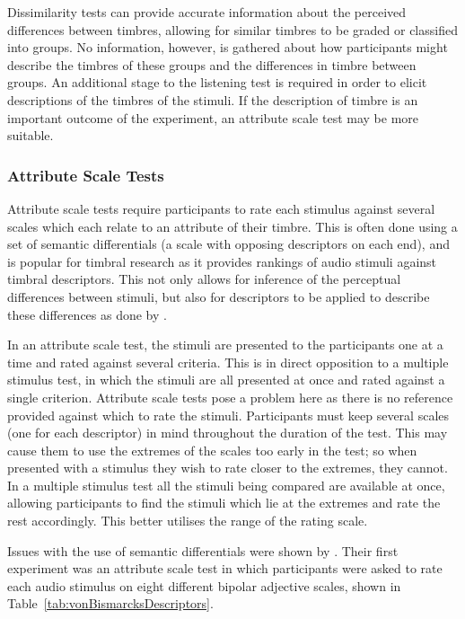 			Dissimilarity tests can provide accurate information about the perceived differences between
			timbres, allowing for similar timbres to be graded or classified into groups. No information,
			however, is gathered about how participants might describe the timbres of these groups and the
			differences in timbre between groups. An additional stage to the listening test is required in
			order to elicit descriptions of the timbres of the stimuli. If the description of timbre is an
			important outcome of the experiment, an attribute scale test may be more suitable.
			
		\subsubsection*{Attribute Scale Tests}
			Attribute scale tests require participants to rate each stimulus against several scales which each
			relate to an attribute of their timbre. This is often done using a set of semantic differentials (a
			scale with opposing descriptors on each end), and is popular for timbral research as it provides
			rankings of audio stimuli against timbral descriptors. This not only allows for inference of the
			perceptual differences between stimuli, but also for descriptors to be applied to describe these
			differences as done by \citet{zacharakis2014an}. 			
			
			In an attribute scale test, the stimuli are presented to the participants one at a time and rated
			against several criteria. This is in direct opposition to a multiple stimulus test, in which the
			stimuli are all presented at once and rated against a single criterion. Attribute scale tests pose
			a problem here as there is no reference provided against which to rate the stimuli. Participants
			must keep several scales (one for each descriptor) in mind throughout the duration of the test.
			This may cause them to use the extremes of the scales too early in the test; so when presented with
			a stimulus they wish to rate closer to the extremes, they cannot. In a multiple stimulus test all
			the stimuli being compared are available at once, allowing participants to find the stimuli which
			lie at the extremes and rate the rest accordingly. This better utilises the range of the
			rating scale. 
			
			Issues with the use of semantic differentials were shown by \citet{kendall1993verbal1}. Their first
			experiment was an attribute scale test in which participants were asked to rate each audio stimulus
			on eight different bipolar adjective scales, shown in Table~\ref{tab:vonBismarcksDescriptors}.

